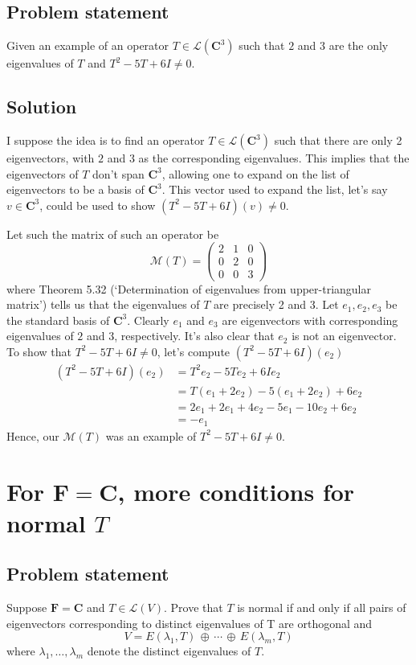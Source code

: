 \documentclass{article}
\begin{document}
\subsection*{Problem statement}
Given an example of an operator $T\in\mathcal{L}(\mathbf{C}^3)$ such that $2$ and $3$ are the only eigenvalues of $T$ and $T^2-5T+6I\neq 0$.

\subsection*{Solution}
I suppose the idea is to find an operator $T\in\mathcal{L}(\mathbf{C}^3)$ such that there are only 2 eigenvectors, with $2$ and $3$ as the corresponding eigenvalues. This implies that the eigenvectors of $T$ don't span $\mathbf{C}^3$, allowing one to expand on the list of eigenvectors to be a basis of $\mathbf{C}^3$. This vector used to expand the list, let's say $v\in \mathbf{C}^3$, could be used to show $(T^2-5T+6I)(v)\neq 0$.

Let such the matrix of such an operator be 
\[\mathcal{M}(T) = \begin{pmatrix}2 & 1 & 0 \\0 & 2 & 0 \\0 & 0 & 3\end{pmatrix}\]
where Theorem 5.32 (`Determination of eigenvalues from upper-triangular matrix') tells us that the eigenvalues of $T$ are precisely 2 and 3. Let $e_1,e_2,e_3$ be the standard basis of $\mathbf{C}^3$. Clearly $e_1$ and $e_3$ are eigenvectors with corresponding eigenvalues of $2$ and $3$, respectively. It's also clear that $e_2$ is not an eigenvector. To show that $T^2-5T+6I\neq 0$, let's compute $(T^2-5T+6I)(e_2)$
\begin{align*}
    (T^2-5T+6I)(e_2)&=T^2e_2-5Te_2+6Ie_2 \\
    &=T(e_1+2e_2)-5(e_1+2e_2)+6e_2 \\
    &=2e_1 + 2e_1+4e_2-5e_1-10e_2+6e_2\\
    &=-e_1
\end{align*}
Hence, our $\mathcal{M}(T)$ was an example of $T^2-5T+6I\neq 0$.

\clearpage

\section{For $\mathbf{F}=\mathbf{C}$, more conditions for normal $T$}
\subsection*{Problem statement}
Suppose $\mathbf{F}=\mathbf{C}$ and $T\in\mathcal{L}(V)$. Prove that $T$ is normal if and only if all pairs of eigenvectors corresponding to distinct eigenvalues of T are orthogonal and
\[V=E(\lambda_1,T)\,\oplus\,\cdots\,\oplus\,E(\lambda_m,T)\]
where $\lambda_1,\ldots,\lambda_m$ denote the distinct eigenvalues of $T$.
\end{document}
